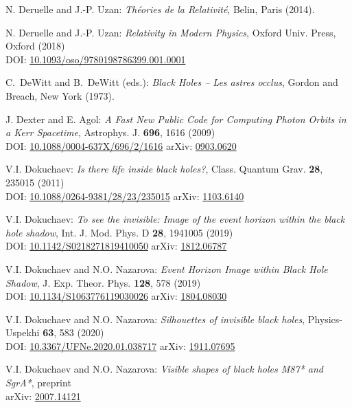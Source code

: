 \begin{thebibliography}{123}
N. Deruelle and J.-P. Uzan: {\em Th\'eories de la Relativit\'e},
Belin, Paris (2014).

N. Deruelle and J.-P. Uzan: {\em Relativity in Modern Physics},
Oxford Univ. Press, Oxford (2018)\\
DOI: \href{https://doi.org/10.1093/oso/9780198786399.001.0001}{10.1093/oso/9780198786399.001.0001}

C.~DeWitt and B.~DeWitt (eds.):
{\em Black Holes -- Les astres occlus},
Gordon and Breach, New York (1973).

J. Dexter and E. Agol:
{\em A Fast New Public Code for Computing Photon Orbits in a Kerr Spacetime},
Astrophys. J. {\bf 696}, 1616 (2009)\\
DOI: \href{https://doi.org/10.1088/0004-637X/696/2/1616}{10.1088/0004-637X/696/2/1616}\hfill
arXiv: \href{https://arxiv.org/abs/0903.0620}{0903.0620}

V.I. Dokuchaev: {\em Is there life inside black holes?},
Class. Quantum Grav. {\bf 28}, 235015 (2011)\\
DOI: \href{https://doi.org/10.1088/0264-9381/28/23/235015}{10.1088/0264-9381/28/23/235015}\hfill
arXiv: \href{https://arxiv.org/abs/1103.6140}{1103.6140}

V.I. Dokuchaev: {\em To see the invisible: Image of the event horizon within the black hole shadow},
Int. J. Mod. Phys. D {\bf 28}, 1941005 (2019)\\
DOI: \href{https://doi.org/10.1142/S0218271819410050}{10.1142/S0218271819410050}\hfill
arXiv: \href{https://arxiv.org/abs/1812.06787}{1812.06787}

V.I. Dokuchaev and N.O. Nazarova: {\em Event Horizon Image within Black Hole Shadow},
J. Exp. Theor. Phys. {\bf 128}, 578 (2019)\\
DOI: \href{https://doi.org/10.1134/S1063776119030026}{10.1134/S1063776119030026}\hfill
arXiv: \href{https://arxiv.org/abs/1804.08030}{1804.08030}

V.I. Dokuchaev and N.O. Nazarova: {\em Silhouettes of invisible black holes},
Physics-Uspekhi {\bf 63}, 583 (2020)\\
DOI: \href{https://doi.org/10.3367/UFNe.2020.01.038717}{10.3367/UFNe.2020.01.038717}\hfill
arXiv: \href{https://arxiv.org/abs/1911.07695}{1911.07695}

V.I. Dokuchaev and N.O. Nazarova: {\em Visible shapes of black holes M87* and SgrA*},
preprint\\
arXiv: \href{https://arxiv.org/abs/2007.14121}{2007.14121}


\end{thebibliography}
